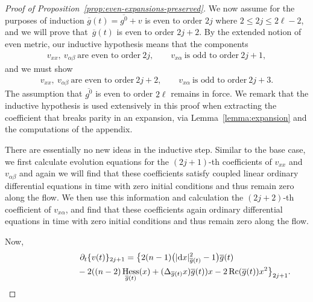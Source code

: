 \documentclass[pdftex]{sigma}
\numberwithin{equation}{section}
\newcommand{\del}{\partial}
\newcommand{\olg}{\overline{g}}
\newcommand{\olgin}{\overline{\gin}}
\newcommand{\gin}{{g^0}}
\newcommand{\gbar}{\overline{g}}
\DeclareMathOperator{\Rc}{Rc}
\DeclareMathOperator{\hess}{Hess}
\begin{document}
\begin{proof}[Proof of Proposition~\ref{prop:even-expansions-preserved}]
We now assume for the purposes of induction $\olg(t) = \olgin + v$ is even to order $2j$ where $2 \leq 2j \leq 2\ell -2$, and we will prove that~$\olg(t)$ is even to order $2j+2$. By the extended notion of even metric, our inductive hypothesis means that the components
\begin{gather*}
 v_{xx}, \ v_{\alpha \beta}\ \mbox{are even to order} \ 2j, \qquad
 v_{x\alpha} \ \mbox{is odd to order} \ 2j+1,
\end{gather*}
and we must show
\begin{gather*}
v_{xx}, \ v_{\alpha \beta} \ \mbox{are even to order} \ 2j+2, \qquad
v_{x\alpha} \ \mbox{is odd to order} \ 2j+3.
\end{gather*}
The assumption that $\olgin$ is even to order $2\ell$ remains in force. We remark that the inductive hypothesis is used extensively in this proof when extracting the coefficient that breaks parity in an expansion, via Lemma~\ref{lemma:expansion} and the computations of the appendix.

There are essentially no new ideas in the inductive step. Similar to the base case, we first calculate evolution equations for the $(2j+1)$-th coefficients of $v_{xx}$ and $v_{\alpha \beta}$ and again we will find that these coefficients satisfy coupled linear ordinary differential equations in time with zero initial conditions and thus remain zero along the flow. We then use this information and calculation the $(2j+2)$-th coefficient of $v_{x\alpha}$, and find that these coefficients again ordinary differential equations in time with zero initial conditions and thus remain zero along the flow.

Now,
\begin{gather*}
 \del_t \{ v(t) \}_{2j+1} =\big\{ 2 (n-1) \big(|{\rm d}x|^2_{\gbar(t)} -1\big) \olg(t) \\
 \hphantom{\del_t \{ v(t) \}_{2j+1} =}{} -2 ( (n-2) \hess_{\olg(t)} (x) + (\Delta_{\olg(t)} x) \olg(t) ) x -2 \Rc(\gbar(t)) x^2 \big\}_{2j+1}.
\end{gather*}


\end{proof}
\end{document}
